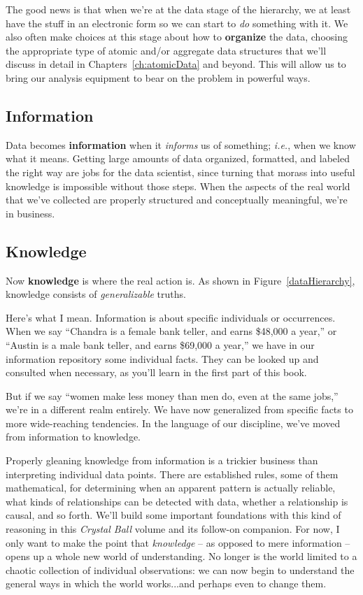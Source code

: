 The good news is that when we're at the data stage of the hierarchy, we at
least have the stuff in an electronic form so we can start to \textit{do}
something with it. We also often make choices at this stage about how to
\textbf{organize} the data, choosing the appropriate type of atomic and/or
aggregate data structures that we'll discuss in detail in
Chapters~\ref{ch:atomicData} and beyond. This will allow us to bring our
analysis equipment to bear on the problem in powerful ways.

\subsection{Information}

Data becomes \textbf{information} when it \textit{informs} us of something;
\textit{i.e.}, when we know what it means. Getting large amounts of data
organized, formatted, and labeled the right way are jobs for the data
scientist, since turning that morass into useful knowledge is impossible
without those steps. When the aspects of the real world that we've collected
are properly structured and conceptually meaningful, we're in business.


\subsection{Knowledge}

Now \textbf{knowledge} is where the real action is. As shown in
Figure~\ref{dataHierarchy}, knowledge consists of \textit{generalizable}
truths.


Here's what I mean. Information is about specific individuals or occurrences.
When we say ``Chandra is a female bank teller, and earns \$48,000 a year,'' or
``Austin is a male bank teller, and earns \$69,000 a year,'' we have in our
information repository some individual facts. They can be looked up and
consulted when necessary, as you'll learn in the first part of this book.

But if we say ``women make less money than men do, even at the same jobs,''
we're in a different realm entirely. We have now generalized from specific
facts to more wide-reaching tendencies. In the language of our discipline,
we've moved from information to knowledge.

Properly gleaning knowledge from information is a trickier business than
interpreting individual data points. There are established rules, some of them
mathematical, for determining when an apparent pattern is actually reliable,
what kinds of relationships can be detected with data, whether a relationship
is causal, and so forth. We'll build some important foundations with this kind
of reasoning in this \textit{Crystal Ball} volume and its follow-on companion.
For now, I only want to make the point that \textit{knowledge} -- as opposed to
mere information -- opens up a whole new world of understanding. No longer is
the world limited to a chaotic collection of individual observations: we can
now begin to understand the general ways in which the world works...and perhaps
even to change them.

